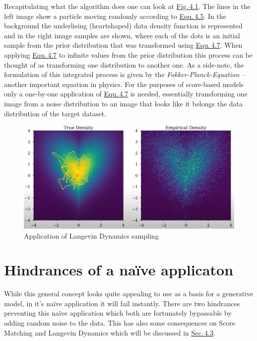 Recapitulating what the algorithm does one can look at \hyperref[fig:4.1]{Fig.\,4.1}. The lines in the left image show a particle moving randomly according to \hyperref[equ:4.5]{Equ.\,4.5}. In the background the underlieing (heartshaped) data density function  is represented and in the right image samples are shown, where each of the dots is an initial sample from the prior distribution that was transformed using \hyperref[equ:4.7]{Equ.\,4.7}. When applying \hyperref[equ:4.7]{Equ.\,4.7} to infinite values from the prior distribution this process can be thought of as transforming one distribution to another one. As a side-note, the formulation of this integrated process is given by the \textit{Fokker-Planck-Equation} – another important equation in physics. For the purposes of score-based models only a one-by-one application of \hyperref[equ:4.7]{Equ.\,4.7} is needed, essentially transforming one image from a noise distribution to an image that looks like it belongs the data distribution of the target dataset.
%
\begin{figure}[] \label{fig:4.1}
    \centering
    \includegraphics[width=.8\textwidth]{Chapters/figures/langevin.PNG}
    \caption[Short-form caption]{Application of Langevin Dynamics sampling}
\end{figure}
\section{Hindrances of a na\"{i}ve applicaton} \label{sec:4.2}
While this general concept looks quite appealing to use as a basis for a generative model, in it's na\"{i}ve application it will fail instantly. There are two hindrances preventing this na\"{i}ve application which both are fortunately bypassable by adding random noise to the data. This has also some consequences on Score Matching and Langevin Dynamics which will be discussed in \hyperref[sec:4.3]{Sec.\,4.3}.
%
